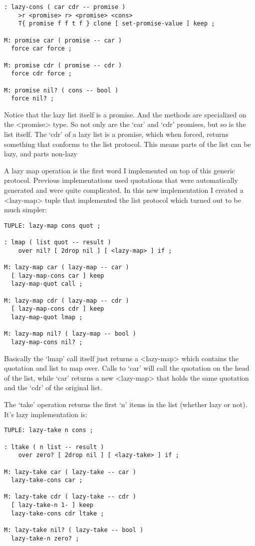 \begin{verbatim}
: lazy-cons ( car cdr -- promise ) 
    >r <promise> r> <promise> <cons> 
    T{ promise f f t f } clone [ set-promise-value ] keep ;

M: promise car ( promise -- car )
  force car force ;

M: promise cdr ( promise -- cdr )
  force cdr force ;

M: promise nil? ( cons -- bool )
  force nil? ;
\end{verbatim}


Notice that the lazy list itself is a promise. And the methods are
specialized on the <promise> type. So not only are the `car' and `cdr'
promises, but so is the list itself. The `cdr' of a lazy list is a
promise, which when forced, returns something that conforms to the
list protocol. This means parts of the list can be lazy, and parts
non-lazy

A lazy map operation is the first word I implemented on top of this
generic protocol. Previous implementations used quotations that were
automatically generated and were quite complicated. In this new
implementation I created a <lazy-map> tuple that implemented the list
protocol which turned out to be much simpler:

\begin{verbatim}
TUPLE: lazy-map cons quot ;

: lmap ( list quot -- result )
    over nil? [ 2drop nil ] [ <lazy-map> ] if ;

M: lazy-map car ( lazy-map -- car )
  [ lazy-map-cons car ] keep
  lazy-map-quot call ;

M: lazy-map cdr ( lazy-map -- cdr )
  [ lazy-map-cons cdr ] keep
  lazy-map-quot lmap ;

M: lazy-map nil? ( lazy-map -- bool )
  lazy-map-cons nil? ;
\end{verbatim}


Basically the `lmap' call itself just returns a <lazy-map> which contains the quotation and list to map over. Calls to `car' will call the quotation on the head of the list, while `car' returns a new <lazy-map> that holds the same quotation and the `cdr' of the original list.

The `take' operation returns the first `n' items in the list (whether
lazy or not). It's lazy implementation is:

\begin{verbatim}
TUPLE: lazy-take n cons ;

: ltake ( n list -- result )
    over zero? [ 2drop nil ] [ <lazy-take> ] if ;
     
M: lazy-take car ( lazy-take -- car )
  lazy-take-cons car ;

M: lazy-take cdr ( lazy-take -- cdr )
  [ lazy-take-n 1- ] keep
  lazy-take-cons cdr ltake ;

M: lazy-take nil? ( lazy-take -- bool )
  lazy-take-n zero? ;
\end{verbatim}


